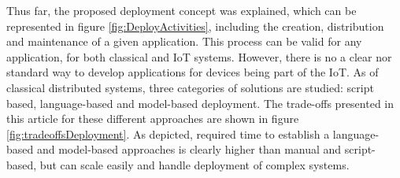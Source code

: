 Thus far, the proposed deployment concept was explained, which can be represented in figure \ref{fig:DeployActivities}, including the creation, distribution and maintenance of a given application.
This process can be valid for any application, for both classical and IoT systems.
However, there is no a clear nor standard way to develop applications for devices being part of the IoT.
As of classical distributed systems, three categories of solutions are studied\cite{talwar2005approaches}: script based, language-based and model-based deployment.
The trade-offs presented in this article for these different approaches are shown in figure \ref{fig:tradeoffsDeployment}.
As depicted, required time to establish a language-based and model-based approaches is clearly higher than manual and script-based, but can scale easily and handle deployment of complex systems.
